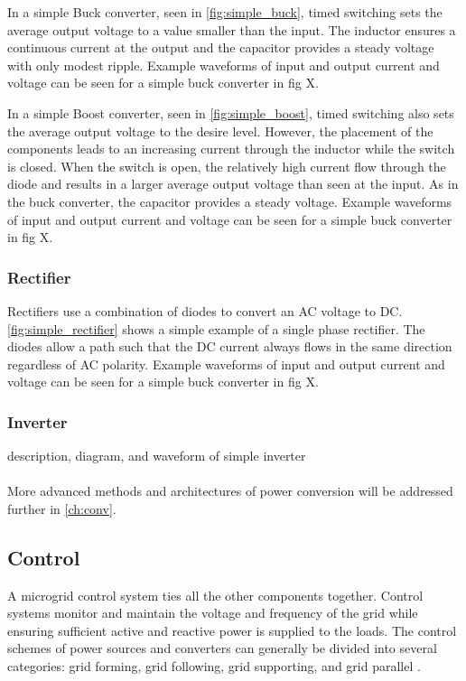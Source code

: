 In a simple Buck converter, seen in \autoref{fig:simple_buck}, timed switching sets the average output voltage to a value smaller than the input. The inductor ensures a continuous current at the output and the capacitor provides a steady voltage with only modest ripple. Example waveforms of input and output current and voltage can be seen for a simple buck converter in fig X.



In a simple Boost converter, seen in \autoref{fig:simple_boost}, timed switching also sets the average output voltage to the desire level. However, the placement of the components leads to an increasing current through the inductor while the switch is closed. When the switch is open, the relatively high current flow through the diode and results in a larger average output voltage than seen at the input. As in the buck converter, the capacitor provides a steady voltage. Example waveforms of input and output current and voltage can be seen for a simple buck converter in fig X.



\subsubsection{Rectifier}
Rectifiers use a combination of diodes to convert an AC voltage to DC. \autoref{fig:simple_rectifier} shows a simple example of a single phase rectifier. The diodes allow a path such that the DC current always flows in the same direction regardless of AC polarity. Example waveforms of input and output current and voltage can be seen for a simple buck converter in fig X.




\subsubsection{Inverter}
description, diagram, and waveform of simple inverter

\paragraph{}
More advanced methods and architectures of power conversion will be addressed further in \autoref{ch:conv}.

\subsection{Control}
A microgrid control system ties all the other components together. Control systems monitor and maintain the voltage and frequency of the grid while ensuring sufficient active and reactive power is supplied to the loads. The control schemes of power sources and converters can generally be divided into several categories: grid forming, grid following, grid supporting, and grid parallel \cite{Ortjohann2012, Engler, Strauss2003}. 

